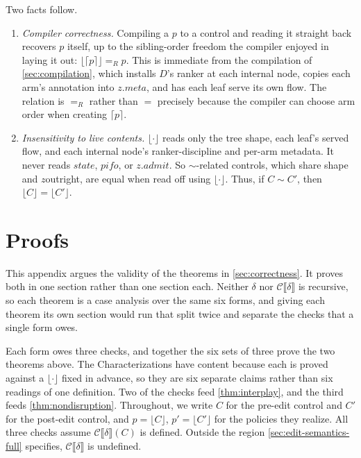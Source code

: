 \documentclass[sigplan,anonymous,review,nonacm]{acmart}
\newcommand{\csem}[1]{\mathcal{C}\llbracket #1 \rrbracket}
\newcommand{\eqR}{=_R}
\newcommand{\notation}[1]{\ensuremath{#1}\ifmmode\else\xspace\fi}
\newcommand{\pifo}{\notation{\mathit{pifo}}}
\newcommand{\zz}{\notation{\mathit{z}}}
\newcommand{\stt}{\notation{\mathit{state}}}
\newcommand{\disc}{\notation{D}}
\begin{document}
Two facts follow.

\begin{enumerate}
\item \emph{Compiler correctness.} Compiling a \(p\) to a control and reading it straight back recovers \(p\) itself, up to the sibling-order freedom the compiler enjoyed in laying it out: \(\lfloor \lceil p \rceil \rfloor \eqR p\).
This is immediate from the compilation of \cref{sec:compilation}, which installs \disc's ranker at each internal node, copies each arm's annotation into \(\mathit{z}.\mathit{meta}\), and has each leaf serve its own flow.
The relation is \(\eqR\) rather than \(=\) precisely because the compiler can choose arm order when creating \(\lceil p \rceil\).
\item \emph{Insensitivity to live contents.} \(\lfloor \cdot \rfloor\) reads only the tree shape, each leaf's served flow, and each internal node's ranker-discipline and per-arm metadata.
It never reads \stt, \pifo, or \(\mathit{z}.\mathit{admit}\).
So \(\sim\)-related controls, which share shape and \zz outright, are equal when read off using \(\lfloor \cdot \rfloor\). 
Thus, if \(C \sim C'\), then \(\lfloor C \rfloor = \lfloor C' \rfloor\).
\end{enumerate}



\section{Proofs}\label{sec:per-form}

This appendix argues the validity of the theorems in \cref{sec:correctness}.
It proves both in one section rather than one section each.
Neither \(\delta\) nor \(\csem{\delta}\) is recursive, so each theorem is a case analysis over the same six forms, and giving each theorem its own section would run that split twice and separate the checks that a single form owes.

Each form owes three checks, and together the six sets of three prove the two theorems above.
The Characterizations have content because each is proved against a \(\lfloor \cdot \rfloor\) fixed in advance, so they are six separate claims rather than six readings of one definition.
Two of the checks feed \cref{thm:interplay}, and the third feeds \cref{thm:nondisruption}.
Throughout, we write \(C\) for the pre-edit control and \(C'\) for the post-edit control, and \(p = \lfloor C \rfloor\), \(p' = \lfloor C' \rfloor\) for the policies they realize.
All three checks assume \(\csem{\delta}(C)\) is defined.
Outside the region \cref{sec:edit-semantics-full} specifies, \(\csem{\delta}\) is undefined.
\end{document}
